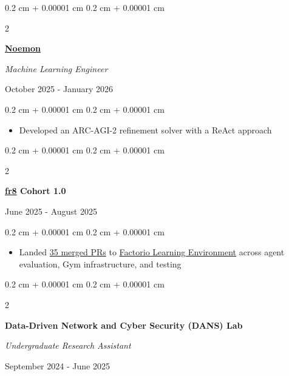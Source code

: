 \documentclass[10pt, letterpaper]{article}
\newenvironment{highlights}{
    \begin{itemize}[
        topsep=0.09 cm,
        parsep=0.09 cm,
        partopsep=0pt,
        itemsep=0pt,
        leftmargin=0.4 cm + 10pt
    ]
}{
    \end{itemize}
}
\newenvironment{onecolentry}{
    \begin{adjustwidth}{
        0.2 cm + 0.00001 cm
    }{
        0.2 cm + 0.00001 cm
    }
}{
    \end{adjustwidth}
}
\newenvironment{twocolentry}[2][]{
    \begin{adjustwidth}{
        0.2 cm + 0.00001 cm
    }{
        0.2 cm + 0.00001 cm
    }
    \def\secondColumn{#2}
    \setcolumnwidth{\fill, 5.2 cm}
    \begin{paracol}{2}
}{
    \switchcolumn \raggedleft \secondColumn
    \end{paracol}
    \end{adjustwidth}
}
\let\hrefWithoutArrow\href
\renewcommand{\href}[2]{\hrefWithoutArrow{#1}{#2}}
\begin{document}
        \vspace{0.09 cm}

        \begin{twocolentry}{October 2025 - January 2026}
            \textbf{\href{https://www.noemon.com}{Noemon}}
            
            \textit{Machine Learning Engineer}

        \end{twocolentry}

        \vspace{0.09 cm}
        \begin{onecolentry}
            \begin{highlights}
                \item Developed an ARC-AGI-2 refinement solver with a ReAct approach
            \end{highlights}
        \end{onecolentry}

        \vspace{0.09 cm}
        
        \begin{twocolentry}{
            June 2025 - August 2025
        }
            \textbf{\href{https://fr8.so}{fr8} Cohort 1.0}

        \end{twocolentry}

        \vspace{0.09 cm}
        \begin{onecolentry}
            \begin{highlights}
                \item Landed \href{https://github.com/JackHopkins/factorio-learning-environment/pulls?q=is\%3Apr+author\%3Akiankyars+is\%3Amerged+merged\%3A2025-06-01..2025-08-31}{35 merged PRs} to \href{https://github.com/JackHopkins/factorio-learning-environment/}{Factorio Learning Environment} across agent evaluation, Gym infrastructure, and testing
            \end{highlights}
        \end{onecolentry}

        \vspace{0.09 cm}

        \begin{twocolentry}{
            September 2024 - June 2025
        }
            \textbf{Data-Driven Network and Cyber Security (DANS) Lab}

            \textit{Undergraduate Research Assistant}
        \end{twocolentry}
\end{document}
